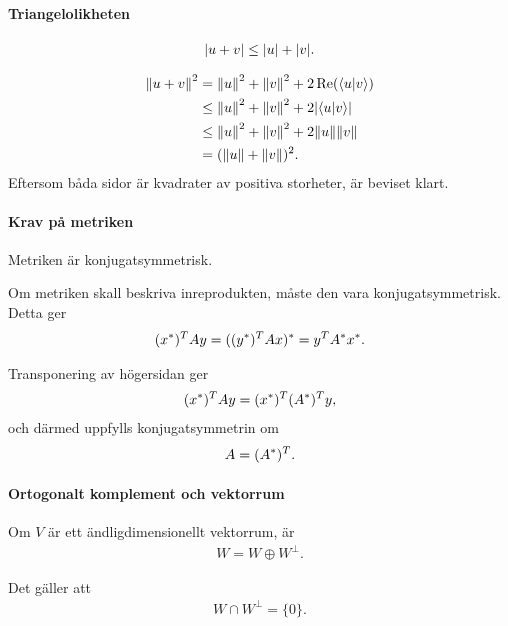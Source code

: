 \paragraph{Triangelolikheten}

\begin{align*}
	\abs{u + v} \leq \abs{u} + \abs{v}.
\end{align*}

\proof
\begin{align*}
	\norm{u + v}^{2} &= \norm{u}^{2} + \norm{v}^{2} + 2\Re(\bra{u}\ket{v}) \\
	                 &\leq \norm{u}^{2} + \norm{v}^{2} + 2\abs{\bra{u}\ket{v}} \\
	                 &\leq \norm{u}^{2} + \norm{v}^{2} + 2\norm{u}\norm{v} \\
	                 &= (\norm{u} + \norm{v})^{2}.
\end{align*}
Eftersom båda sidor är kvadrater av positiva storheter, är beviset klart.

\paragraph{Krav på metriken}
Metriken är konjugatsymmetrisk.

\proof
Om metriken skall beskriva inreprodukten, måste den vara konjugatsymmetrisk. Detta ger
\begin{align*}
	(x^{*})^{T}Ay = ((y^{*})^{T}Ax)^{*} = y^{T}A^{*}x^{*}.
\end{align*}

Transponering av högersidan ger
\begin{align*}
	(x^{*})^{T}Ay = (x^{*})^{T}(A^{*})^{T}y,
\end{align*}
och därmed uppfylls konjugatsymmetrin om
\begin{align*}
	A = (A^{*})^{T}.
\end{align*}

\paragraph{Ortogonalt komplement och vektorrum}
Om $V$ är ett ändligdimensionellt vektorrum, är
\begin{align*}
	W = W \oplus W^{\perp}.
\end{align*}

\proof
Det gäller att
\begin{align*}
	W \cap W^{\perp} = \{0\}.
\end{align*}

